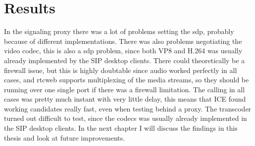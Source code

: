 \section{Results}
In the signaling proxy there was a lot of problems setting the \gls{sdp}, probably because of different implementations. There was also problems negotiating the video codec, this is also a \gls{sdp} problem, since both VP8 and H.264 was usually already implemented by the SIP desktop clients. There could theoretically be a firewall issue, but this is highly doubtable since audio worked perfectly in all cases, and \gls{rtcweb} supports multiplexing of the media streams, so they should be running over one single port if there was a firewall limitation. The calling in all cases was pretty much instant with very little delay, this means that ICE found working candidates really fast, even when testing behind a proxy. The transcoder turned out difficult to test, since the codecs was usually already implemented in the SIP desktop clients. In the next chapter I will discuss the findings in this thesis and look at future improvements.